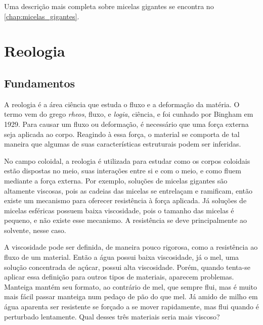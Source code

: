 	Uma descrição mais completa sobre micelas gigantes se encontra no \autoref{chap:micelas_gigantes}.

	\chapter{Reologia}
		\section{Fundamentos} 
		
		A reologia é a área ciência que estuda o fluxo e a deformação da matéria. O termo vem do grego \emph{rheos}, fluxo, e \emph{logia}, ciência, e foi cunhado por Bingham em 1929.\cite{Bingham1929} Para causar um fluxo ou deformação, é necessário que uma força externa seja aplicada ao corpo. Reagindo à essa força, o material se comporta de tal maneira que algumas de suas características estruturais podem ser inferidas. %
		
		No campo coloidal, a reologia é utilizada para estudar como os corpos coloidais estão dispostas no meio, suas interações entre si e com o meio, e como fluem mediante a força externa. Por exemplo, soluções de micelas gigantes são altamente viscosas, pois as cadeias das micelas se entrelaçam e ramificam,\cite{Rehage1991} então existe um mecanismo para oferecer resistência à força aplicada. Já soluções de micelas esféricas possuem baixa viscosidade, pois o tamanho das micelas é pequeno, e não existe esse mecanismo. A resistência se deve principalmente ao solvente, nesse caso.
		
		A viscosidade pode ser definida, de maneira pouco rigorosa, como a resistência ao fluxo de um material.\cite{Boger1989}  Então a água possui baixa viscosidade, já o mel, uma solução concentrada de açúcar, possui alta viscosidade. Porém, quando tenta-se aplicar essa definição para outros tipos de materiais, aparecem problemas. Manteiga mantém seu formato, ao contrário de mel, que sempre flui, mas é muito mais fácil passar manteiga num pedaço de pão do que mel. Já amido de milho em água aparenta ser resistente se forçado a se mover rapidamente, mas flui quando é perturbado lentamente. Qual desses três materiais seria mais viscoso? 
		
